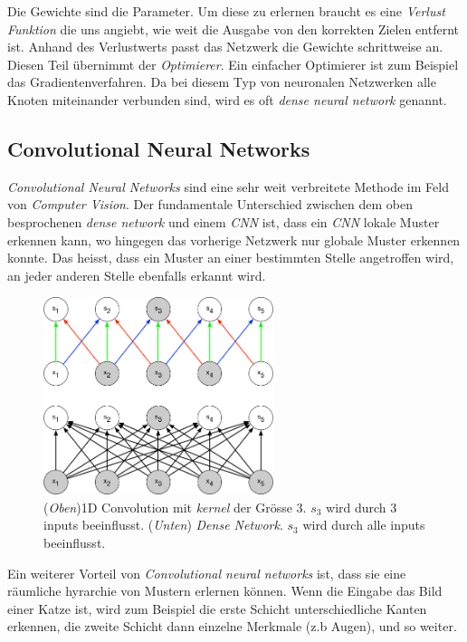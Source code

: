 Die Gewichte sind die Parameter. Um diese zu erlernen braucht es eine \textit{Verlust Funktion} die uns angiebt, wie weit die Ausgabe von den korrekten Zielen entfernt ist. Anhand des Verlustwerts passt das Netzwerk die Gewichte schrittweise an. Diesen Teil übernimmt der  \textit{Optimierer}. Ein einfacher Optimierer ist zum Beispiel das Gradientenverfahren.
Da bei diesem Typ von neuronalen Netzwerken alle Knoten miteinander verbunden sind, wird es oft \textit{dense neural network} genannt.


\subsection{Convolutional Neural Networks}
\textit{Convolutional Neural Networks} sind eine sehr weit verbreitete Methode im Feld von \textit{Computer Vision}. Der fundamentale Unterschied zwischen dem oben besprochenen \textit{dense network} und einem \textit{CNN} ist, dass ein \textit{CNN} lokale Muster erkennen kann, wo hingegen das vorherige Netzwerk nur globale Muster erkennen konnte. Das heisst, dass ein Muster an einer bestimmten Stelle angetroffen wird, an jeder anderen Stelle ebenfalls erkannt wird. \parencite{chollet}
\begin{figure}[hbt]
	\centering
		\includegraphics[width=0.6\textwidth]{assets/conv_1d.png}
	\caption{(\textit{Oben})1D Convolution mit \textit{kernel} der Grösse 3. $s_3$ wird durch 3 inputs beeinflusst.
		     (\textit{Unten}) \textit{Dense Network}. $s_3$ wird durch alle inputs beeinflusst.\parencite{goodfellow}}
	\label{img:conv}
\end{figure}

Ein weiterer Vorteil von \textit{Convolutional neural networks} ist, dass sie eine räumliche hyrarchie von Mustern erlernen können. Wenn die Eingabe das Bild einer Katze ist, wird zum Beispiel die erste Schicht unterschiedliche Kanten erkennen, die zweite Schicht dann einzelne Merkmale (z.b Augen), und so weiter.

